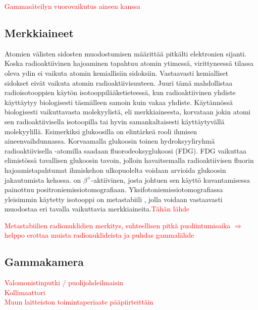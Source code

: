 \textcolor{red}{Gammasäteilyn vuorovaikutus aineen kanssa}\\

\subsection{Merkkiaineet}
Atomien välisten sidosten muodostumisen määrittää pitkälti elektronien sijanti. Koska radioaktiivinen hajoaminen tapahtuu atomin ytimessä, virittyneessä tilassa oleva ydin ei vaikuta atomin kemiallisiin sidoksiin. Vastaavasti kemialliset sidokset eivät vaikuta atomin radioaktiivisuuteen.\cite{cherry_modes_2012} Juuri tämä mahdollistaa radioisotooppien käytön isotooppilääketieteessä, kun radioaktiivinen yhdiste käyttäytyy biologisesti täsmälleen samoin kuin vakaa yhdiste. Käytännössä biologisesti vaikuttavasta molekyylistä, eli merkkiaineesta, korvataan jokin atomi sen radioaktiivisella isotoopilla tai hyvin samankaltaisesti käyttäytyvällä molekyylillä. Esimerkiksi glukoosilla on elintärkeä rooli ihmisen aineenvaihdunnassa. Korvaamalla glukoosin toinen hydroksyyliryhmä radioaktiivisella -atomilla saadaan fluorodeoksyglukoosi (FDG). FDG vaikuttaa elimistössä tavallisen glukoosin tavoin, jolloin havaitsemalla radioaktiivisen fluorin hajoamistapahtumat ihmiskehon ulkopuolelta voidaan arvioida glukoosin jakautumista kehossa.  on $\beta^{+}$-aktiivinen, josta johtuen sen käyttö kuvantamisessa painottuu positroniemissiotomografiaan. Yksifotoniemissiotomografiassa yleisimmin käytetty isotooppi on metastabiili , jolla voidaan vastaavasti muodostaa eri tavalla vaikuttavia merkkiaineita.\textcolor{red}{Tähän lähde}

\textcolor{red}{Metastabiilien radionuklidien merkitys, suhteellisen pitkä puoliintumisaika $\Longrightarrow$ helppo erottaa muista radionuklideista ja puhdas gammalähde}


\subsection{Gammakamera}
\textcolor{red}{Valomonistinputki / puolijohdeilmaisin}\\
\textcolor{red}{Kollimaattori}\\
\textcolor{red}{Muun laitteiston toimintaperiaate pääpiirteittäin}